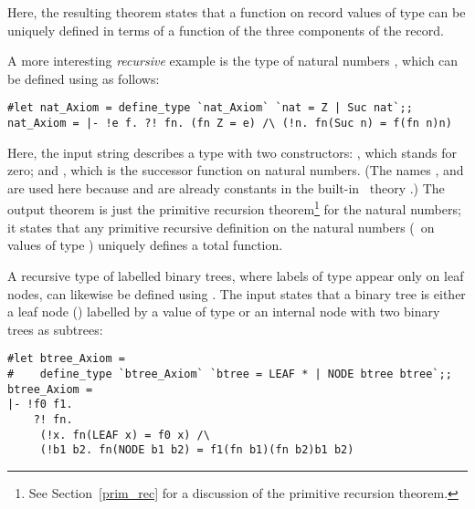 \noindent Here, the resulting theorem states that a function  on
record values of type  can be
uniquely defined in terms of a function  of the three components of
the record.

A more interesting {\it recursive\/}
  example is the type of natural
numbers
, which can be defined using  as follows:

\begin{session}\begin{verbatim}
#let nat_Axiom = define_type `nat_Axiom` `nat = Z | Suc nat`;;
nat_Axiom = |- !e f. ?! fn. (fn Z = e) /\ (!n. fn(Suc n) = f(fn n)n)
\end{verbatim}\end{session}

\noindent Here, the input string describes a type  with two
constructors: , which stands for zero; and , which is the
successor function on natural numbers.  (The names
, and  are used here because  and  are already
constants in the built-in \HOL\ theory .)
The output theorem is just the primitive recursion
theorem\footnote{See Section~\ref{prim_rec} for a discussion of
the primitive recursion theorem.}
for the natural numbers; it states that any primitive recursive definition on
the natural numbers (\ie\ on values of type )
uniquely defines a total function.

A recursive type of labelled binary trees, where labels of type \ml{*}
appear only on leaf nodes, can likewise be defined using .
The input states that a binary tree is either a leaf node ()
labelled by a value of type \ml{*} or an internal node  with
two binary trees as subtrees:

\begin{session}\begin{verbatim}
#let btree_Axiom =
#    define_type `btree_Axiom` `btree = LEAF * | NODE btree btree`;;
btree_Axiom =
|- !f0 f1.
    ?! fn.
     (!x. fn(LEAF x) = f0 x) /\
     (!b1 b2. fn(NODE b1 b2) = f1(fn b1)(fn b2)b1 b2)
\end{verbatim}\end{session}\label{btree-def}

